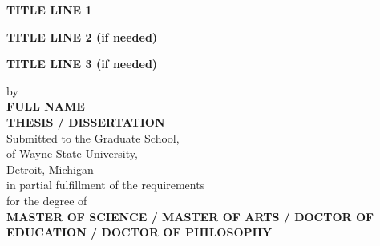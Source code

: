 \centerline{\bf TITLE LINE 1}
\vspace{-0.4cm}
\centerline{\bf TITLE LINE 2 (if needed)}
\vspace{-0.4cm}
\centerline{\bf TITLE LINE 3 (if needed)}

\vskip-0.4cm

\thispagestyle{empty}

\begin{center}
    \vspace{-0.4cm}
    by \\
    {\bf FULL NAME}\\ %
    {\bf THESIS / DISSERTATION}\\  %
    Submitted to the Graduate School,\\
    of Wayne State University,\\
    Detroit, Michigan\\
    in partial fulfillment of the requirements\\
    for the degree of\\
    {\bf MASTER OF SCIENCE / MASTER OF ARTS / DOCTOR OF EDUCATION / DOCTOR OF PHILOSOPHY} %
\end{center}

